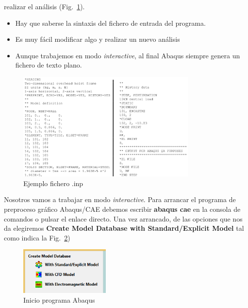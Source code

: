 \begin{enumerate}
  realizar el análisis (Fig.~\ref{figu09}).
  \begin{itemize}
  \item Hay que saberse la sintaxis del fichero de entrada  del programa.
  \item Es muy fácil modificar algo y realizar un nuevo análisis
  \item Aunque trabajemos en modo \textit{interactive}, al final
    Abaqus siempre genera un fichero de texto plano.
  \end{itemize}
  \begin{figure}[H]
    \begin{center}
      \includegraphics[width=0.8\textwidth]{./body/images/imagen09}
    \end{center}
    \caption{Ejemplo fichero .inp}
    \label{figu09}
  \end{figure}
\end{enumerate}

Nosotros vamos a trabajar en modo \textit{interactive}. Para arrancar
el programa de preproceso gráfico Abaqus/CAE debemos escribir
\textbf{abaqus cae} en la consola de comandos o pulsar el enlace
directo. Una vez arrancado, de las opciones que nos da elegiremos
\textbf{Create Model Database with Standard/Explicit Model} tal como
indica la Fig.~\ref{figu00})
\begin{figure}
  \begin{center}
    \includegraphics[width=0.4\textwidth]{./body/images/imagen00}
  \end{center}
  \caption{Inicio programa Abaqus}
  \label{figu00}
\end{figure}

